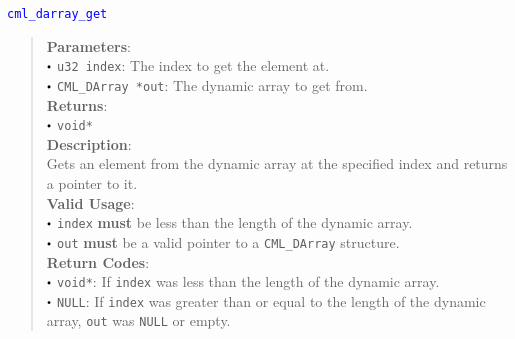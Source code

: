 \documentclass[a4paper,oneside,8pt]{extarticle}
\newcommand{\function}[1]{
  \noindent\textcolor{blue}{\texttt{#1}}
  \vspace{-0.3em}
}
\renewcommand{\dot}{\raisebox{0.3ex}{\scalebox{0.6}{$\bullet$}}}
\theoremstyle{definition}
\begin{document}
\function{cml\_darray\_get}
\begin{quote}
  \textbf{Parameters}: \\
  $\dot$ \texttt{u32 index}: The index to get the element at. \\
  $\dot$ \texttt{CML\_DArray *out}: The dynamic array to get from. \\
  \textbf{Returns}: \\
  $\dot$ \texttt{void*} \\

  \vspace{-0.75em}
  \textbf{Description}: \\
  Gets an element from the dynamic array at the specified index and returns a pointer to it. \\

  \vspace{-0.75em}
  \textbf{Valid Usage}: \\
  $\dot$ \texttt{index} \textbf{must} be less than the length of the dynamic array. \\
  $\dot$ \texttt{out} \textbf{must} be a valid pointer to a \texttt{CML\_DArray} structure. \\

  \vspace{-0.75em}
  \textbf{Return Codes}: \\
  $\dot$ \texttt{void*}: If \texttt{index} was less than the length of the dynamic array. \\
  $\dot$ \texttt{NULL}: If \texttt{index} was greater than or equal to the length of the dynamic array, \texttt{out} was \texttt{NULL} or empty. \\
\end{quote}
\end{document}
